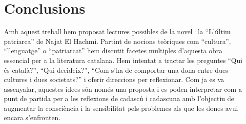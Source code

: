 \section{Conclusions}

Amb aquest treball hem proposat lectures possibles de la novel·la ``L'últim patriarca'' de Najat El Hachmi.
Partint de nocions teòriques com ``cultura'', ``llenguatge'' o ``patriarcat'' hem discutit facetes multiples d'aquesta obra essencial per a la literatura catalana.
Hem intentat a tractar les preguntes ``Qui és català?'', ``Qui decideix?'', ``Com s’ha de comportar una dona entre dues cultures i dues societats?''
i oferir direccions per reflexionar.
Com ja es va assenyalar, aquestes idees són només una proposta i es poden interpretar com a punt de partida per a les reflexions de cadascú i cadascuna amb l'objectiu de augmentar la consciència i la sensibilitat pels problemes als que les dones avui encara s'enfronten.

\begin{comment}
[Vidal2012]
"Y el mundo de El Hachmi no es sino un
palimpsesto, por eso también lo son sus libros, tablillas en la que se aprecian hue-
llas de escrituras/culturas anteriores y en las que leemos la última, que se nos apa-
rece más perceptible. Sin embargo, las huellas persisten."


\end{comment}

